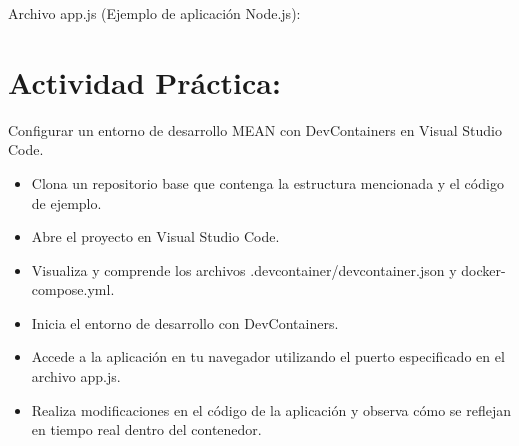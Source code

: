 \documentclass[
  a4paper,
  DIV=11,
  numbers=noendperiod,
  onepage,
  openany]{scrreprt}
\newenvironment{Shaded}{\begin{snugshade}}{\end{snugshade}}
\newcommand{\BuiltInTok}[1]{\textcolor[rgb]{0.00,0.23,0.31}{#1}}
\newcommand{\DecValTok}[1]{\textcolor[rgb]{0.68,0.00,0.00}{#1}}
\newcommand{\FunctionTok}[1]{\textcolor[rgb]{0.28,0.35,0.67}{#1}}
\newcommand{\KeywordTok}[1]{\textcolor[rgb]{0.00,0.23,0.31}{#1}}
\newcommand{\NormalTok}[1]{\textcolor[rgb]{0.00,0.23,0.31}{#1}}
\newcommand{\OperatorTok}[1]{\textcolor[rgb]{0.37,0.37,0.37}{#1}}
\newcommand{\PreprocessorTok}[1]{\textcolor[rgb]{0.68,0.00,0.00}{#1}}
\newcommand{\SpecialCharTok}[1]{\textcolor[rgb]{0.37,0.37,0.37}{#1}}
\newcommand{\StringTok}[1]{\textcolor[rgb]{0.13,0.47,0.30}{#1}}
\newcommand{\VerbatimStringTok}[1]{\textcolor[rgb]{0.13,0.47,0.30}{#1}}
\providecommand{\tightlist}{%
  \setlength{\itemsep}{0pt}\setlength{\parskip}{0pt}}\usepackage{longtable,booktabs,array}
\begin{document}
Archivo app.js (Ejemplo de aplicación Node.js):

\begin{Shaded}
\end{Shaded}

\hypertarget{actividad-pruxe1ctica-4}{%
\section{Actividad Práctica:}\label{actividad-pruxe1ctica-4}}

Configurar un entorno de desarrollo MEAN con DevContainers en Visual
Studio Code.

\begin{itemize}
\tightlist
\item
  Clona un repositorio base que contenga la estructura mencionada y el
  código de ejemplo.
\item
  Abre el proyecto en Visual Studio Code.
\item
  Visualiza y comprende los archivos .devcontainer/devcontainer.json y
  docker-compose.yml.
\item
  Inicia el entorno de desarrollo con DevContainers.
\item
  Accede a la aplicación en tu navegador utilizando el puerto
  especificado en el archivo app.js.
\item
  Realiza modificaciones en el código de la aplicación y observa cómo se
  reflejan en tiempo real dentro del contenedor.
\end{itemize}
\end{document}
